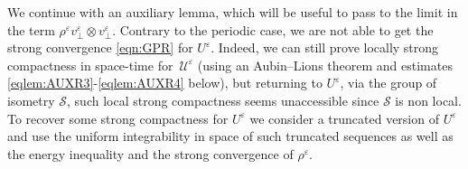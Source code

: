\documentclass[11pt,reqno]{amsart}
\begin{document}
We continue with an auxiliary lemma, which will be useful to pass to the limit in the term $ \rho^\varepsilon v_\perp^\varepsilon \otimes v_\perp^\varepsilon$. Contrary to the periodic case, we are not able to get the strong convergence \eqref{eqn:GPR} for $U^\varepsilon$. Indeed, we can still prove locally  strong compactness in space-time for $\, \mathcal U^\varepsilon$ (using an Aubin--Lions theorem and estimates \eqref{eqlem:AUXR3}-\eqref{eqlem:AUXR4} below), but returning to $U^\varepsilon$, via the group of isometry  $\mathcal S$, such local strong compactness seems unaccessible since $ \mathcal S$ is non local. To recover some strong compactness for $U^\varepsilon$ we consider a truncated version of $U^\varepsilon$ and use the uniform integrability in space of such truncated sequences as well as the energy inequality and the strong convergence of $\rho^\varepsilon$.
\end{document}
